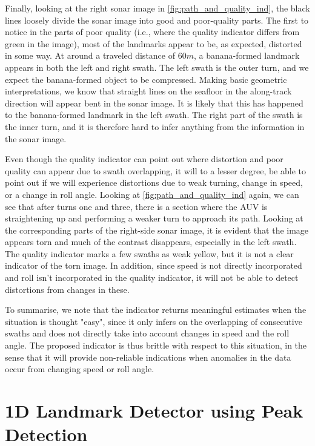Finally, looking at the right sonar image in \cref{fig:path_and_quality_ind}, the black lines loosely divide the sonar image into good and poor-quality parts. The first to notice in the parts of poor quality (i.e., where the quality indicator differs from green in the image), most of the landmarks appear to be, as expected, distorted in some way. At around a traveled distance of $60 m$, a banana-formed landmark appears in both the left and right swath. The left swath is the outer turn, and we expect the banana-formed object to be compressed. Making basic geometric interpretations, we know that straight lines on the seafloor in the along-track direction will appear bent in the sonar image. It is likely that this has happened to the banana-formed landmark in the left swath. The right part of the swath is the inner turn, and it is therefore hard to infer anything from the information in the sonar image.

Even though the quality indicator can point out where distortion and poor quality can appear due to swath overlapping, it will to a lesser degree, be able to point out if we will experience distortions due to weak turning, change in speed, or a change in roll angle. Looking at \cref{fig:path_and_quality_ind} again, we can see that after turns one and three, there is a section where the AUV is straightening up and performing a weaker turn to approach its path. Looking at the corresponding parts of the right-side sonar image, it is evident that the image appears torn and much of the contrast disappears, especially in the left swath. The quality indicator marks a few swaths as weak yellow, but it is not a clear indicator of the torn image. In addition, since speed is not directly incorporated and roll isn't incorporated in the quality indicator, it will not be able to detect distortions from changes in these.

To summarise, we note that the indicator returns meaningful estimates when the situation is thought "easy", since it only infers on the overlapping of consecutive swaths and does not directly take into account changes in speed and the roll angle. The proposed indicator is thus brittle with respect to this situation, in the sense that it will provide non-reliable indications when anomalies in the data occur from changing speed or roll angle.  

\section{1D Landmark Detector using Peak Detection} \label{sec:disc_1D_landmark_detector}

